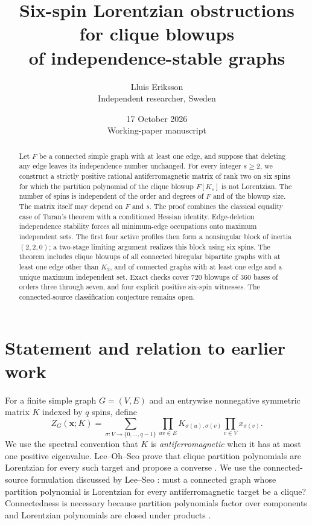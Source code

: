 \documentclass[11pt]{article}
\title{Six-spin Lorentzian obstructions for clique blowups\\of independence-stable graphs}
\author{Lluis Eriksson\\\small Independent researcher, Sweden}
\date{17 October 2026\\\small Working-paper manuscript}
\theoremstyle{remark}\newtheorem{remark}[theorem]{Remark}
\begin{document}
\maketitle
\begin{abstract}
Let $F$ be a connected simple graph with at least one edge, and suppose
that deleting any edge leaves its independence number unchanged.
For every integer $s\ge2$, we construct a strictly positive rational
antiferromagnetic matrix of rank two on six spins for which the
partition polynomial of the clique blowup $F[K_s]$ is not Lorentzian.
The number of spins is independent of the order and degrees of $F$
and of the blowup size. The matrix itself may depend on $F$ and $s$.
The proof combines the classical equality case of Turan's theorem
with a conditioned Hessian identity. Edge-deletion independence
stability forces all minimum-edge occupations onto maximum
independent sets. The first four active profiles then form a
nonsingular block of inertia $(2,2,0)$; a two-stage limiting argument
realizes this block using six spins. The theorem includes clique
blowups of all connected biregular bipartite graphs with at least
one edge other than $K_2$, and of connected graphs with at least
one edge and a unique maximum independent set.
Exact checks cover 720 blowups of 360 bases of orders three through
seven, and four explicit positive six-spin witnesses.
The connected-source classification conjecture remains open.
\end{abstract}

\section{Statement and relation to earlier work}

For a finite simple graph $G=(V,E)$ and an entrywise nonnegative
symmetric matrix $K$ indexed by $q$ spins, define
\begin{equation}
 Z_G(\mathbf x;K)=
 \sum_{\sigma:V\to\{0,\ldots,q-1\}}
 \prod_{uv\in E}K_{\sigma(u),\sigma(v)}
 \prod_{v\in V}x_{\sigma(v)}.                    \label{eq:partition}
\end{equation}
We use the spectral convention that $K$ is \emph{antiferromagnetic}
when it has at most one positive eigenvalue. Lee--Oh--Seo prove that
clique partition polynomials are Lorentzian for every such target
and propose a converse \cite{LOS}. We use the connected-source
formulation discussed by Lee--Seo \cite{LS}: must a connected graph
whose partition polynomial is Lorentzian for every antiferromagnetic
target be a clique? Connectedness is necessary because partition
polynomials factor over components and Lorentzian polynomials are
closed under products \cite{BH}.
\end{document}
